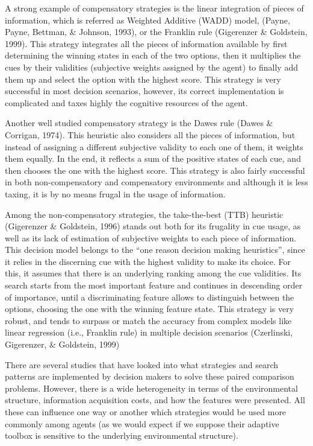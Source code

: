 \documentclass[
  english,
  man]{apa6}
\begin{document}
A strong example of compensatory strategies is the linear integration of pieces of information, which is referred as Weighted Additive (WADD) model, (Payne, Payne, Bettman, \& Johnson, 1993), or the Franklin rule (Gigerenzer \& Goldstein, 1999). This strategy integrates all the pieces of information available by first determining the winning states in each of the two options, then it multiplies the cues by their validities (subjective weights assigned by the agent) to finally add them up and select the option with the highest score. This strategy is very successful in most decision scenarios, however, its correct implementation is complicated and taxes highly the cognitive resources of the agent.

Another well studied compensatory strategy is the Dawes rule (Dawes \& Corrigan, 1974). This heuristic also considers all the pieces of information, but instead of assigning a different subjective validity to each one of them, it weights them equally. In the end, it reflects a sum of the positive states of each cue, and then chooses the one with the highest score. This strategy is also fairly successful in both non-compensatory and compensatory environments and although it is less taxing, it is by no means frugal in the usage of information.

Among the non-compensatory strategies, the take-the-best (TTB) heuristic (Gigerenzer \& Goldstein, 1996) stands out both for its frugality in cue usage, as well as its lack of estimation of subjective weights to each piece of information. This decision model belongs to the ``one reason decision making heuristics'', since it relies in the discerning cue with the highest validity to make its choice. For this, it assumes that there is an underlying ranking among the cue validities. Its search starts from the most important feature and continues in descending order of importance, until a discriminating feature allows to distinguish between the options, choosing the one with the winning feature state. This strategy is very robust, and tends to surpass or match the accuracy from complex models like linear regression (i.e., Franklin rule) in multiple decision scenarios (Czerlinski, Gigerenzer, \& Goldstein, 1999)

There are several studies that have looked into what strategies and search patterns are implemented by decision makers to solve these paired comparison problems. However, there is a wide heterogeneity in terms of the environmental structure, information acquisition costs, and how the features were presented. All these can influence one way or another which strategies would be used more commonly among agents (as we would expect if we suppose their adaptive toolbox is sensitive to the underlying environmental structure).
\end{document}
